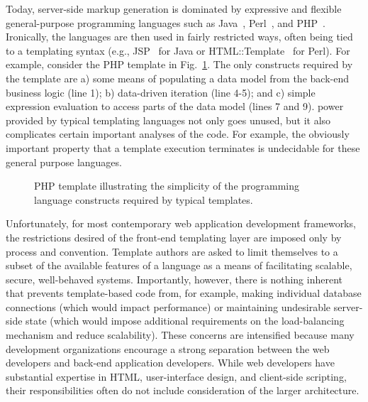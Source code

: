 \documentclass{www2003-submission}
\newcommand{\figref}[1]{Fig.~\ref{fig-#1}}
\begin{document}
Today, server-side markup generation is dominated by expressive and
flexible general-purpose programming languages such as
Java~\cite{Java}, Perl~\cite{Perl}, and PHP~\cite{PHP}.  Ironically,
the languages are then used in fairly restricted ways, often being
tied to a templating syntax (e.g., JSP~\cite{JSP} for Java or
HTML::Template~\cite{HTML-Template} for Perl).  For example, consider
the PHP template in \figref{php-books}.  The only constructs required
by the template are a) some means of populating a data model from the
back-end business logic (line 1); b) data-driven iteration (line 4-5);
and c) simple expression evaluation to access parts of the data model
(lines 7 and 9). %
power provided by typical templating languages not only goes unused,
but it also complicates certain important analyses of the code.  For
example, the obviously important property that a template execution
terminates is undecidable for these general purpose languages.

\begin{figure}[tb]
\caption{PHP template illustrating the simplicity of the programming
language constructs required by typical templates.
\label{fig-php-books}}
\end{figure}

Unfortunately, for most contemporary web application development
frameworks, the restrictions desired of the front-end templating layer
are imposed only by process and convention.  Template authors are
asked to limit themselves to a subset of the available features of a
language as a means of facilitating scalable, secure, well-behaved
systems.  Importantly, however, there is nothing inherent that
prevents template-based code from, for example, making individual
database connections (which would impact performance) or maintaining
undesirable server-side state (which would impose additional
requirements on the load-balancing mechanism and reduce scalability).
These concerns are intensified because many development organizations
encourage a strong separation between the web developers and back-end
application developers. While web developers have substantial
expertise in HTML, user-interface design, and client-side scripting,
their responsibilities often do not include consideration of the
larger architecture.
\end{document}
